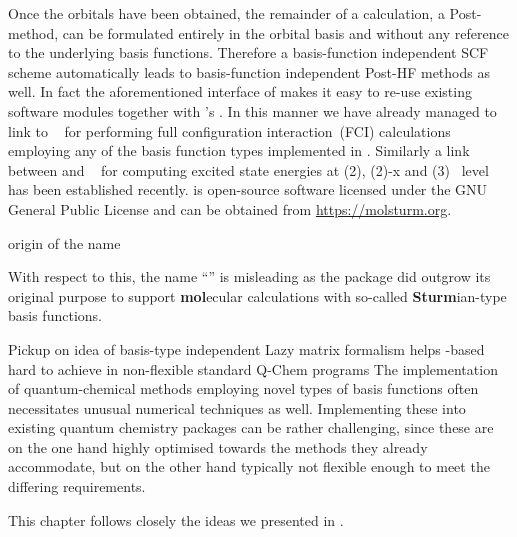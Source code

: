 Once the \SCF orbitals have been obtained,
the remainder of a calculation, \eg a Post-\HF method,
can be formulated entirely in the \SCF orbital basis
and without any reference to the underlying basis functions.
Therefore a basis-function independent SCF scheme automatically
leads to basis-function independent Post-HF methods as well.
In fact the aforementioned \python interface of \molsturm
makes it easy to re-use existing software modules
together with \molsturm's \SCF.
In this manner we have already managed to link \molsturm to \pyscf~\cite{Sun2017}
for performing full configuration interaction~(FCI) calculations employing any of the
basis function types implemented in \molsturm.
Similarly a link between \molsturm and \adcman~\cite{Wormit2014}
for computing excited state energies at \ADC(2),
\ADC(2)-x and \ADC(3)~\cite{Schirmer1982,Trofimov1999} level
has been established recently.
\molsturm is open-source software licensed under the
GNU General Public License and can be obtained from \url{https://molsturm.org}.




origin of the name

With respect to this, the name ``\molsturm'' is misleading
as the package did outgrow its original purpose to support
\textbf{mol}ecular calculations with so-called \textbf{Sturm}ian-type
basis functions.


Pickup on idea of basis-type independent \SCF
Lazy matrix formalism helps
\contraction-based \SCF hard to achieve in non-flexible standard
Q-Chem programs
The implementation of quantum-chemical methods
employing novel types of basis functions often necessitates
unusual numerical techniques as well.
Implementing these into existing quantum chemistry packages
can be rather challenging,
since these are on the one hand highly optimised towards the methods
they already accommodate,
but on the other hand typically not flexible enough
to meet the differing requirements.


This chapter follows closely the ideas we presented in \cite{molsturmDesign}.





